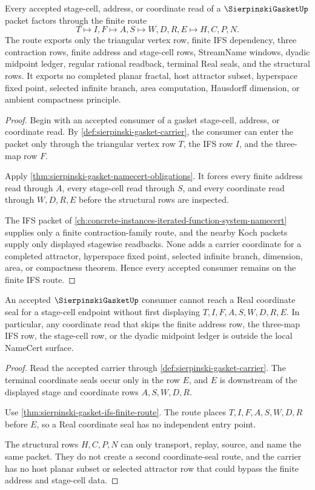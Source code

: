 \begin{theorem}
\label{thm:sierpinski-gasket-ifs-finite-route}
Every accepted stage-cell, address, or coordinate read of a $\SierpinskiGasketUp$ packet factors through the finite route
$$
T \longmapsto I,F \longmapsto A,S \longmapsto W,D,R,E \longmapsto H,C,P,N .
$$
The route exports only the triangular vertex row, finite IFS dependency, three contraction rows, finite address and stage-cell rows, StreamName windows, dyadic midpoint ledger, regular rational readback, terminal Real seals, and the structural rows. It exports no completed planar fractal, host attractor subset, hyperspace fixed point, selected infinite branch, area computation, Hausdorff dimension, or ambient compactness principle.
\end{theorem}
\begin{proof}
Begin with an accepted consumer of a gasket stage-cell, address, or coordinate read. By \autoref{def:sierpinski-gasket-carrier}, the consumer can enter the packet only through the triangular vertex row $T$, the IFS row $I$, and the three-map row $F$.

Apply \autoref{thm:sierpinski-gasket-namecert-obligations}. It forces every finite address read through $A$, every stage-cell read through $S$, and every coordinate read through $W,D,R,E$ before the structural rows are inspected.

The IFS packet of \autoref{ch:concrete-instances-iterated-function-system-namecert} supplies only a finite contraction-family route, and the nearby Koch packets supply only displayed stagewise readbacks. None adds a carrier coordinate for a completed attractor, hyperspace fixed point, selected infinite branch, dimension, area, or compactness theorem. Hence every accepted consumer remains on the finite IFS route.
\end{proof}

\begin{theorem}
\label{thm:sierpinski-gasket-nonescape}
An accepted $\SierpinskiGasketUp$ consumer cannot reach a Real coordinate seal for a stage-cell endpoint without first displaying $T,I,F,A,S,W,D,R,E$. In particular, any coordinate read that skips the finite address row, the three-map IFS row, the stage-cell row, or the dyadic midpoint ledger is outside the local NameCert surface.
\end{theorem}
\begin{proof}
Read the accepted carrier through \autoref{def:sierpinski-gasket-carrier}. The terminal coordinate seals occur only in the row $E$, and $E$ is downstream of the displayed stage and coordinate rows $A,S,W,D,R$.

Use \autoref{thm:sierpinski-gasket-ifs-finite-route}. The route places $T,I,F,A,S,W,D,R$ before $E$, so a Real coordinate seal has no independent entry point.

The structural rows $H,C,P,N$ can only transport, replay, source, and name the same packet. They do not create a second coordinate-seal route, and the carrier has no host planar subset or selected attractor row that could bypass the finite address and stage-cell data.
\end{proof}

